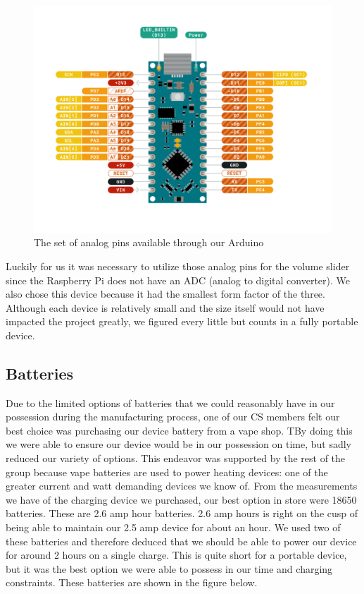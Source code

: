 \begin{figure}[h!]
  \centering
  \includegraphics[width=0.8\linewidth]{image/Pins.png}
  \caption{The set of analog pins available through our Arduino}
  \label{fig:pins}
\end{figure}

Luckily for us it was necessary to utilize those analog pins for the volume slider since the Raspberry Pi does not have an ADC (analog to digital converter). We also chose this device because it had the smallest form factor of the three. Although each device is relatively small and the size itself would not have impacted the project greatly, we figured every little but counts in a fully portable device.

\subsection{Batteries}

Due to the limited options of batteries that we could reasonably have in our possession during the manufacturing process, one of our CS members felt our best choice was purchasing our device battery from a vape shop. TBy doing this we were able to ensure our device would be in our possession on time, but sadly reduced our variety of options. This endeavor was supported by the rest of the group because vape batteries are used to power heating devices: one of the greater current and watt demanding devices we know of. From the measurements we have of the charging device we purchased, our best option in store were 18650 batteries. These are 2.6 amp hour batteries. 2.6 amp hours is right on the cusp of being able to maintain our 2.5 amp device for about an hour. We used two of these batteries and therefore deduced that we should be able to power our device for around 2 hours on a single charge. This is quite short for a portable device, but it was the best option we were able to possess in our time and charging constraints. These batteries are shown in the figure below.

